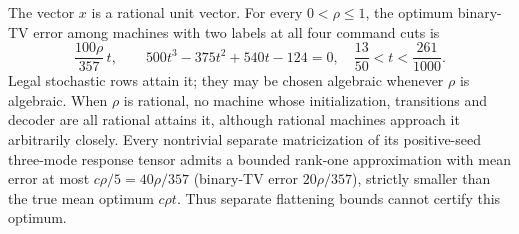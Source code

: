 \begin{theorem}\label{thm:orthogonal50}
The vector $x$ is a rational unit vector. For every $0<\rho\le1$,
the optimum binary-TV error among machines with two labels at all
four command cuts is
\begin{equation}\label{eq:orthogonal-opt50}
 \frac{100\rho}{357}\,t,
 \qquad 500t^3-375t^2+540t-124=0,
 \quad\frac{13}{50}<t<\frac{261}{1000}.
\end{equation}
Legal stochastic rows attain it; they may be chosen algebraic whenever
$\rho$ is algebraic. When $\rho$ is rational, no machine
whose initialization, transitions and decoder are all rational attains
it, although rational machines approach it arbitrarily closely.
Every nontrivial separate matricization of its positive-seed three-mode response
tensor admits a bounded rank-one approximation with mean error at most
$c\rho/5=40\rho/357$ (binary-TV error $20\rho/357$), strictly smaller than the true mean optimum $c\rho t$.
Thus separate flattening bounds cannot certify this optimum.
\end{theorem}
